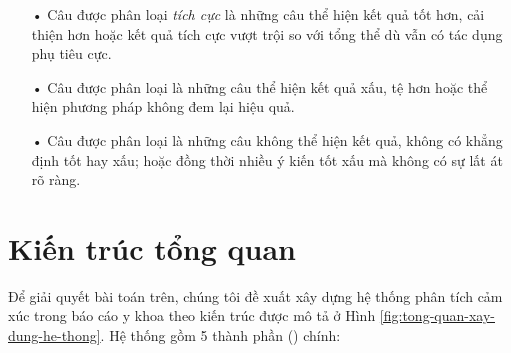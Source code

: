 \begin{itemize}
\item[•] Câu được phân loại \textit{tích cực} là những câu thể hiện kết quả tốt hơn, cải thiện hơn hoặc kết quả tích cực vượt trội so với tổng thể dù vẫn có tác dụng phụ tiêu cực.\\
\item[•]  Câu được phân loại \tieucuc là những câu thể hiện kết quả xấu, tệ hơn hoặc thể hiện phương pháp không đem lại hiệu quả.\\
\item[•] Câu được phân loại \trungtinh là những câu không thể hiện kết quả, không có khẳng định tốt hay xấu; hoặc đồng thời nhiều ý kiến tốt xấu mà không có sự lất át rõ ràng.\\
\end{itemize}

\section{Kiến trúc tổng quan} \label{subsec:kien-truc-tong-quan}
Để giải quyết bài toán trên, chúng tôi đề xuất xây dựng hệ thống phân tích cảm xúc trong báo cáo y khoa theo kiến trúc được mô tả ở Hình \ref{fig:tong-quan-xay-dung-he-thong}. Hệ thống gồm 5 thành phần () chính: \\

